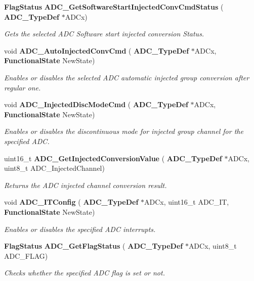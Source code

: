 \begin{DoxyCompactItemize}
\textbf{ Flag\+Status} \textbf{ A\+D\+C\+\_\+\+Get\+Software\+Start\+Injected\+Conv\+Cmd\+Status} (\textbf{ A\+D\+C\+\_\+\+Type\+Def} $\ast$A\+D\+Cx)
\begin{DoxyCompactList}\small\item\em Gets the selected A\+DC Software start injected conversion Status. \end{DoxyCompactList}\item 
void \textbf{ A\+D\+C\+\_\+\+Auto\+Injected\+Conv\+Cmd} (\textbf{ A\+D\+C\+\_\+\+Type\+Def} $\ast$A\+D\+Cx, \textbf{ Functional\+State} New\+State)
\begin{DoxyCompactList}\small\item\em Enables or disables the selected A\+DC automatic injected group conversion after regular one. \end{DoxyCompactList}\item 
void \textbf{ A\+D\+C\+\_\+\+Injected\+Disc\+Mode\+Cmd} (\textbf{ A\+D\+C\+\_\+\+Type\+Def} $\ast$A\+D\+Cx, \textbf{ Functional\+State} New\+State)
\begin{DoxyCompactList}\small\item\em Enables or disables the discontinuous mode for injected group channel for the specified A\+DC. \end{DoxyCompactList}\item 
uint16\+\_\+t \textbf{ A\+D\+C\+\_\+\+Get\+Injected\+Conversion\+Value} (\textbf{ A\+D\+C\+\_\+\+Type\+Def} $\ast$A\+D\+Cx, uint8\+\_\+t A\+D\+C\+\_\+\+Injected\+Channel)
\begin{DoxyCompactList}\small\item\em Returns the A\+DC injected channel conversion result. \end{DoxyCompactList}\item 
void \textbf{ A\+D\+C\+\_\+\+I\+T\+Config} (\textbf{ A\+D\+C\+\_\+\+Type\+Def} $\ast$A\+D\+Cx, uint16\+\_\+t A\+D\+C\+\_\+\+IT, \textbf{ Functional\+State} New\+State)
\begin{DoxyCompactList}\small\item\em Enables or disables the specified A\+DC interrupts. \end{DoxyCompactList}\item 
\textbf{ Flag\+Status} \textbf{ A\+D\+C\+\_\+\+Get\+Flag\+Status} (\textbf{ A\+D\+C\+\_\+\+Type\+Def} $\ast$A\+D\+Cx, uint8\+\_\+t A\+D\+C\+\_\+\+F\+L\+AG)
\begin{DoxyCompactList}\small\item\em Checks whether the specified A\+DC flag is set or not. \end{DoxyCompactList}\item 

\end{DoxyCompactItemize}
